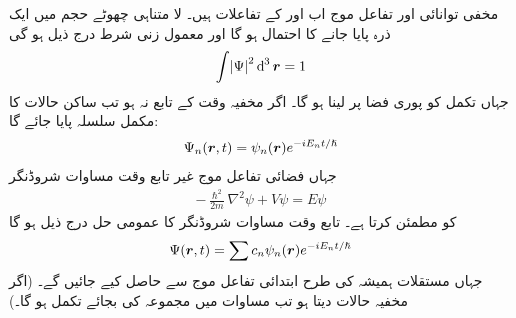 مخفی توانائی  اور تفاعل موج  اب  اور  کے تفاعلات ہیں۔ لا متناہی چھوٹے حجم  میں ایک ذرہ پایا جانے کا احتمال  ہو گا اور معمول زنی شرط درج ذیل ہو گی
\begin{align}\label{مساوات_ابعادی_معمول_زنی_شرط}
\int\abs{\Psi}^{2}\dif^{\,3}\kvec{r}=1 
\end{align}
جہاں تکمل کو پوری فضا پر لینا ہو گا۔ اگر مخفیہ وقت کے تابع نہ ہو تب ساکن حالات کا مکمل سلسلہ پایا جائے گا:
\begin{align}
\Psi_{n}({{\boldsymbol{r}}},t)=\psi_{n}({{\boldsymbol{r}}})e^{-iE_{n}t/\hslash} 
\end{align}
جہاں فضائی تفاعل موج  غیر تابع وقت مساوات شروڈنگر 
\begin{align}
-\frac{\hslash^{2}}{2m}\nabla^{2}\psi+V\psi=E\psi
\end{align}
کو مطمئن کرتا ہے۔ تابع وقت مساوات شروڈنگر کا عمومی حل درج ذیل ہو گا
\begin{align}\label{مساوات_ابعادی_عمومی_حل_الف}
\Psi({{\boldsymbol{r}}},t)=\sum c_{n}\psi_{n}({{\boldsymbol{r}}})e^{-iE_{n}t/\hslash} 
\end{align}
جہاں مستقلات  ہمیشہ کی طرح ابتدائی تفاعل موج  سے حاصل کیے جائیں گے۔ (اگر مخفیہ  حالات دیتا ہو تب مساوات  میں مجموعہ کی بجائے تکمل ہو گا۔)

